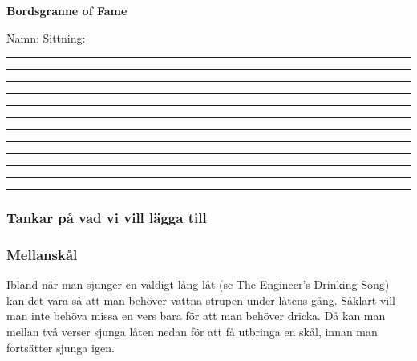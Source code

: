 \noBackground

\newpage
\resetBackground

\thispagestyle{plainnohead}

\vspace*{-13mm} %
\enlargethispage{15mm} %

\begin{center}
    \normalfont\normalsize\bfseries Bordsgranne of Fame
\end{center}

Namn: \hspace{2.5cm} Sittning: 

\vspace*{0.3cm}
\rule{\textwidth}{0.0mm}
\vspace*{0.65cm}
\rule{\textwidth}{0.4mm}
\vspace*{0.65cm}
\rule{\textwidth}{0.4mm}
\vspace*{0.65cm}
\rule{\textwidth}{0.4mm}
\vspace*{0.65cm}
\rule{\textwidth}{0.4mm}
\vspace*{0.65cm}
\rule{\textwidth}{0.4mm}
\vspace*{0.65cm}
\rule{\textwidth}{0.4mm}
\vspace*{0.65cm}
\rule{\textwidth}{0.4mm}
\vspace*{0.65cm}
\rule{\textwidth}{0.4mm}
\vspace*{0.65cm}
\rule{\textwidth}{0.4mm}
\vspace*{0.65cm}
\rule{\textwidth}{0.4mm}
\vspace*{0.65cm}
\rule{\textwidth}{0.4mm}

\noBackground

\newpage
\resetBackground




\subsubsection*{Tankar på vad vi vill lägga till}

\subsubsection*{Mellanskål}
Ibland när man sjunger en väldigt lång låt (se The Engineer's Drinking Song) kan det vara så att man behöver vattna strupen under låtens gång. Såklart vill man inte behöva missa en vers bara för att man behöver dricka. Då kan man mellan två verser sjunga låten nedan för att få utbringa en skål, innan man fortsätter sjunga igen.

